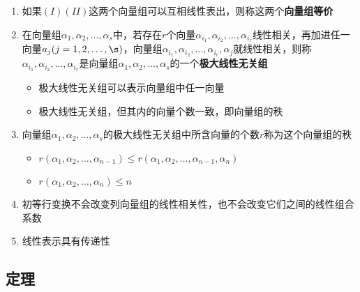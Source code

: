 \documentclass[a4paper,12pt]{article}
\begin{document}
\begin{enumerate}
        \item 如果$(I)(II)$这两个向量组可以互相线性表出，则称这两个\textbf{向量组等价}
        \item 在向量组$\alpha_1, \alpha_2, \dots, \alpha_s$中，若存在$r$个向量$\alpha_{i_1}, \alpha_{i_2}, \dots, \alpha_{i_r}$线性相关，再加进任一向量$a_j(j = 1,2,\dots,\s)$，向量组$\alpha_{i_1}, \alpha_{i_2}, \dots, \alpha_{i_r}, \alpha_j$就线性相关，则称$\alpha_{i_1}, \alpha_{i_2}, \dots, \alpha_{i_r}$是向量组$\alpha_1, \alpha_2, \dots, \alpha_s$的一个\textbf{极大线性无关组}
        \begin{itemize}
            \item 极大线性无关组可以表示向量组中任一向量
            \item 极大线性无关组{\color[rgb]{0.2, 0.6, 0.3}{不唯一}}，但其内的向量个数一致，即向量组的秩
        \end{itemize}
        \item 向量组$\alpha_1, \alpha_2, \dots, \alpha_s$的极大线性无关组中所含向量的个数$r$称为这个向量组的秩
        \begin{itemize}
            \item $r(\alpha_1, \alpha_2, \dots, \alpha_{n-1}) \le r(\alpha_1, \alpha_2, \dots, \alpha_{n-1}, \alpha_n)$
            \item $r(\alpha_1, \alpha_2, \dots, \alpha_n) \le n$
        \end{itemize}
        \item 初等行变换不会改变列向量组的线性相关性，也不会改变它们之间的线性组合系数
        \item 线性表示具有传递性
    \end{enumerate}

    \subsection{定理}
\end{document}
